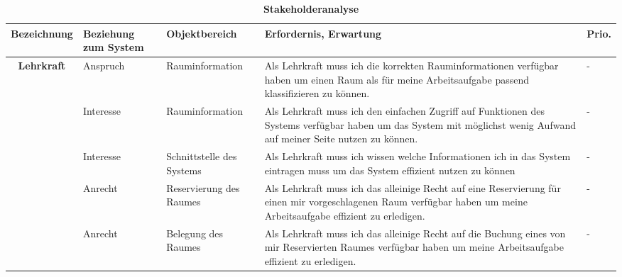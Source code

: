 
\begin{table}[h]
	\caption{\textbf{Stakeholderanalyse}}
 	\begin{tabularx}{\textwidth}{|c|X|X|X|m{}|}
		\rowcolor{heading}\textbf{Bezeichnung} & \textbf{Beziehung zum System} & \textbf{Objektbereich} & \textbf{Erfordernis, Erwartung} & \textbf{Prio.}\\ \hline
		
		\textbf{Lehrkraft} 	& Anspruch & Rauminformation & 	Als Lehrkraft muss ich die korrekten Rauminformationen verfügbar haben um einen Raum als für meine Arbeitsaufgabe passend klassifizieren zu können. & -\\
\rowcolor{odd}	 & Interesse & Rauminformation & Als Lehrkraft muss ich den einfachen Zugriff auf Funktionen des Systems verfügbar haben um das System mit möglichst wenig Aufwand auf meiner Seite nutzen zu können. & -\\
		 & Interesse & Schnittstelle des Systems & Als Lehrkraft muss ich wissen welche Informationen ich in das System eintragen muss um das System effizient nutzen zu können & -\\
\rowcolor{odd}	 & Anrecht & Reservierung des Raumes & Als Lehrkraft muss ich das alleinige Recht auf eine Reservierung für einen mir vorgeschlagenen Raum verfügbar haben um meine Arbeitsaufgabe effizient zu erledigen. & -\\
		 & Anrecht & Belegung des Raumes & 	Als Lehrkraft muss ich das alleinige Recht auf die Buchung eines von mir Reservierten Raumes verfügbar haben um meine Arbeitsaufgabe effizient zu erledigen. & -\\ \hline

 	\end{tabularx}
\end{table}

